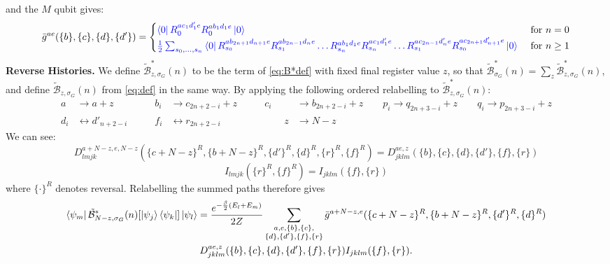 and the $M$ qubit gives:
\begin{equation}
       \bar g^{ae}(\{b\},\{c\},\{d\},\{d'\}) = \begin{cases} \textcolor{blue}{\bra{0}R_{0}^{ac_1d'_1e}R_{0}^{ab_1d_1e}\ket{0}}& \text{ for } n = 0\\
       \textcolor{blue}{\frac12\sum_{s_0,\ldots,s_n}
       \bra{0}R_{s_0}^{ab_{2n+1}d_{n+1}e}R_{s_1}^{ab_{2n-1}d_ne}\ldots
       R_{s_n}^{ab_{1}d_{1}e} R_{s_n}^{ac_{1}d'_{1}e}\ldots
       R_{s_1}^{ac_{2n-1}d'_ne}R_{s_0}^{ac_{2n+1}d'_{n+1}e}\ket{0}} & \text{ for } n \geq 1
       \end{cases}
       \label{eq:gbar-definition}
\end{equation}
\textbf{Reverse Histories.} We define $\tilde{\mathcal{B}}^*_{z,\sigma_G}(n)$ to be the term of \eqref{eq:B*def} with fixed final register value $z$, so that $\tilde{\mathcal{B}}^*_{\sigma_G}(n) = \sum_z \tilde{\mathcal{B}}^*_{z,\sigma_G}(n)$, and define $\tilde{\mathcal{B}}_{z,\sigma_G}(n)$ from \eqref{eq:def} in the same way. By applying the following ordered relabelling to $\tilde{\mathcal{B}}^*_{z,\sigma_G}(n)$:
\begin{align}
    a &\rightarrow a+ z &\qquad b_i &\rightarrow c_{2n+2-i} + z\qquad& c_i &\rightarrow b_{2n+2-i} + z  \qquad p_i \rightarrow q_{2n+3-i}+z \qquad q_i \rightarrow p_{2n+3-i} +z\\   d_i &\leftrightarrow d'_{n+2-i} &\qquad f_i &\leftrightarrow r_{2n+2-i} &\qquad z &\rightarrow N -z
\end{align}
We can see:
\begin{equation}
   D^{a+N-z,e,N-z}_{lmjk}(\{c+N-z\}^R,\{b+N-z\}^R,\{d'\}^R,\{d\}^R,\{r\}^R,\{f\}^R) =  D^{ae,z}_{jklm}(\{b\},\{c\},\{d\},\{d'\},\{f\},\{r\})
\end{equation}
\begin{equation}
    I_{lmjk}(\{r\}^R,\{f\}^R) = I_{jklm}(\{f\},\{r\})
\end{equation}
where $\{\cdot\}^R$ denotes reversal.
Relabelling the summed paths therefore gives
\begin{multline}
     \bra{\psi_m}\tilde{\mathcal{B}}^*_{N-z,\sigma_G}(n)[\ket{\psi_j}\bra{\psi_k}]\ket{\psi_l} = \frac{e^{-\frac{\beta}{2}(E_l+E_m)}}{2Z}\sum_{\substack{a,e,\{b\},\{c\},\\\{d\},\{d'\},\{f\},\{r\}}} \bar g^{a+N -z,e}(\{c+N -z\}^R,\{b+N -z\}^R,\{d'\}^R,\{d\}^R) 
     \\D^{ae,z}_{jklm}(\{b\},\{c\},\{d\},\{d'\},\{f\},\{r\})I_{jklm}(\{f\},\{r\}).
     \label{eq:relabelline}
\end{multline}
